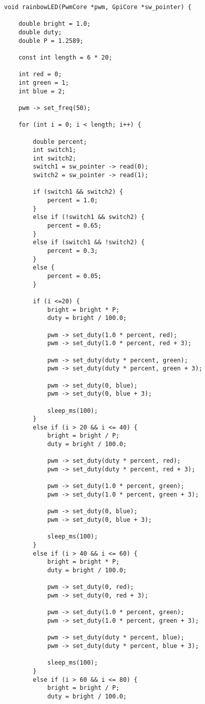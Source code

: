 \documentclass[11pt]{article}
\begin{document}
\begin{lstlisting}[style=CStyle, caption = Rainbow LED Function]
void rainbowLED(PwmCore *pwm, GpiCore *sw_pointer) {

	double bright = 1.0;
	double duty;
	double P = 1.2589;
	
	const int length = 6 * 20;
	
	int red = 0;
	int green = 1;
	int blue = 2;
	
	pwm -> set_freq(50);
	
	for (int i = 0; i < length; i++) {
	
		double percent;
		int switch1;
		int switch2;
		switch1 = sw_pointer -> read(0);
		switch2 = sw_pointer -> read(1);
		
		if (switch1 && switch2) {
			percent = 1.0;
		}
		else if (!switch1 && switch2) {
			percent = 0.65;
		}
		else if (switch1 && !switch2) {
			percent = 0.3;
		}
		else {
			percent = 0.05;
		}
		
		if (i <=20) {
			bright = bright * P;
			duty = bright / 100.0;
			
			pwm -> set_duty(1.0 * percent, red);
			pwm -> set_duty(1.0 * percent, red + 3);
			
			pwm -> set_duty(duty * percent, green);
			pwm -> set_duty(duty * percent, green + 3);
			
			pwm -> set_duty(0, blue);
			pwm -> set_duty(0, blue + 3);
			
			sleep_ms(100);
		}
		else if (i > 20 && i <= 40) {
			bright = bright / P;
			duty = bright / 100.0;
			
			pwm -> set_duty(duty * percent, red);
			pwm -> set_duty(duty * percent, red + 3);
			
			pwm -> set_duty(1.0 * percent, green);
			pwm -> set_duty(1.0 * percent, green + 3);
			
			pwm -> set_duty(0, blue);
			pwm -> set_duty(0, blue + 3);
			
			sleep_ms(100);
		}
		else if (i > 40 && i <= 60) {
			bright = bright * P;
			duty = bright / 100.0;
			
			pwm -> set_duty(0, red);
			pwm -> set_duty(0, red + 3);
			
			pwm -> set_duty(1.0 * percent, green);
			pwm -> set_duty(1.0 * percent, green + 3);
			
			pwm -> set_duty(duty * percent, blue);
			pwm -> set_duty(duty * percent, blue + 3);
			
			sleep_ms(100);
		}
		else if (i > 60 && i <= 80) {
			bright = bright / P;
			duty = bright / 100.0;
			

\end{lstlisting}
\end{document}
